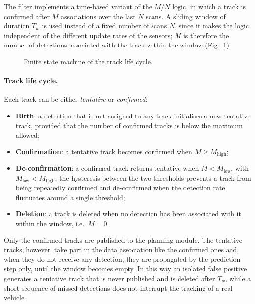 The filter implements a time-based variant of the $M/N$ logic, in which a track is confirmed after $M$
associations over the last $N$ scans. A sliding window of duration $T_w$ is used instead of a fixed number of scans $N$, since
it makes the logic independent of the different update rates of the sensors; $M$ is
therefore the number of detections associated with the track within the window
(Fig.~\ref{fig:tt_mn_logic}).

\begin{figure}[H]
    \centering
    
    \caption{Finite state machine of the track life cycle.}
    \label{fig:tt_mn_logic}
\end{figure}

\paragraph{Track life cycle.} Each track can be either \emph{tentative} or
\emph{confirmed}:
\begin{itemize}
    \item \textbf{Birth}: a detection that is not assigned to any track initialises a new
    tentative track, provided that the number of confirmed tracks is below the maximum
    allowed;
    \item \textbf{Confirmation}: a tentative track becomes confirmed when
    $M \geq M_{\mathrm{high}}$;
    \item \textbf{De-confirmation}: a confirmed track returns tentative when
    $M < M_{\mathrm{low}}$, with $M_{\mathrm{low}} < M_{\mathrm{high}}$; the hysteresis
    between the two thresholds prevents a track from being repeatedly confirmed and
    de-confirmed when the detection rate fluctuates around a single threshold;
    \item \textbf{Deletion}: a track is deleted when no detection has been associated with
    it within the window, i.e.\ $M = 0$.
\end{itemize}
Only the confirmed tracks are published to the planning module. The tentative tracks,
however, take part in the data association like the confirmed ones and, when they do not
receive any detection, they are propagated by the prediction step only, until the window
becomes empty. In this way an isolated false positive generates a tentative track that is
never published and is deleted after $T_w$, while a short sequence of missed detections
does not interrupt the tracking of a real vehicle.


